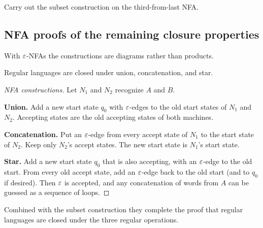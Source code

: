 \begin{exercise}
Carry out the subset construction on the third-from-last NFA.
\end{exercise}

\subsection{NFA proofs of the remaining closure properties}
With $\varepsilon$-NFAs the constructions are diagrams rather than products.

\begin{theorem}
Regular languages are closed under union, concatenation, and star.
\end{theorem}

\begin{proof}[NFA constructions]
Let $N_1$ and $N_2$ recognize $A$ and $B$.

\textbf{Union.} Add a new start state $q_0$ with $\varepsilon$-edges to the old start
states of $N_1$ and $N_2$. Accepting states are the old accepting states of both
machines.

\textbf{Concatenation.} Put an $\varepsilon$-edge from every accept state of $N_1$ to
the start state of $N_2$. Keep only $N_2$'s accept states. The new start state
is $N_1$'s start state.

\textbf{Star.} Add a new start state $q_0$ that is also accepting, with an
$\varepsilon$-edge to the old start. From every old accept state, add an $\varepsilon$-edge
back to the old start (and to $q_0$ if desired). Then $\varepsilon$ is accepted, and
any concatenation of words from $A$ can be guessed as a sequence of loops.
\end{proof}

Combined with the subset construction they complete the proof that regular
languages are closed under the three regular operations.

